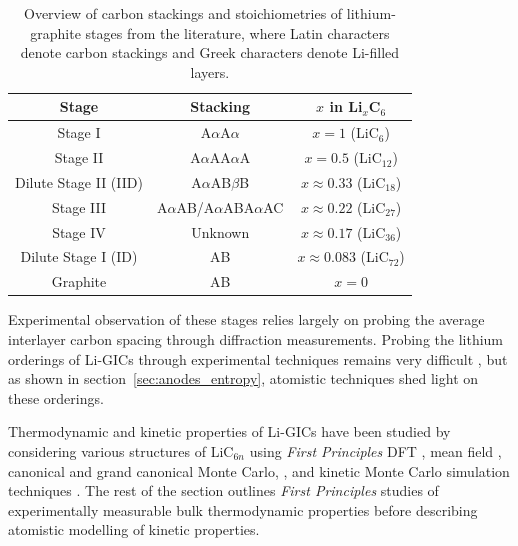 \documentclass[../main.tex]{subfiles}
\begin{document}
\begin{table}
    \caption{{Overview of carbon stackings and stoichiometries of lithium-graphite stages from the literature, where Latin characters denote carbon stackings and Greek characters denote Li-filled layers. \cite{TRUCANO1975,Okamoto1989,GUERARD1975337,Billaud1996,BILLAUD2002299,Woo1983,Dahn1991,Ohzuku1993}}}
    \label{table:graphite_stages}
    \begin{tabular}{|c c c|} 
         \hline
         Stage & Stacking & $x$ in Li$_{x}$C$_{6}$  \\
         \hline
         Stage I & A$\alpha$A$\alpha$ & $x = 1$ (LiC$_{6}$)    \\
         Stage II & A$\alpha$AA$\alpha$A & $x = 0.5$ (LiC$_{12}$)  \\
         Dilute Stage II (IID) & A$\alpha$AB$\beta$B & $x \approx 0.33$ (LiC$_{18}$)   \\
         Stage III & A$\alpha$AB/A$\alpha$ABA$\alpha$AC & $x \approx 0.22$ (LiC$_{27}$) \\
         Stage IV & Unknown & $x \approx 0.17$ (LiC$_{36}$)  \\
         Dilute Stage I (ID) & AB & $x \approx 0.083$ (LiC$_{72}$)  \\
         Graphite & AB & $x = 0$   \\
         \hline
    \end{tabular}
\end{table}

Experimental observation of these stages relies largely on probing the average interlayer carbon spacing through diffraction measurements. Probing the lithium orderings of Li-GICs through experimental techniques remains very difficult \cite{Zheng1995,Konar2015,Senyshyn2013,Taminato2016,Mercer2019,Mercer2021}, but as shown in section~\ref{sec:anodes_entropy}, atomistic techniques shed light on these orderings.

Thermodynamic and kinetic properties of Li-GICs have been studied by considering various structures of LiC$_{6n}$ using \textit{First Principles} DFT \cite{thinius2014theoretical, Hakim, Qiong, Doreen,JI201866,Wang,persson2010,persson2010lithium,hazrati_li_2014,peng2020lithium,hazrati_li_2014}, mean field \cite{Mercer2019,Leiva2017b,OTERO2017569}, canonical and grand canonical Monte Carlo, \cite{Gavil_n_Arriazu_2018,persson2010,C7CP04253A}, and kinetic Monte Carlo simulation techniques \cite{JI201866,persson2010,gavilan-arriazu_effect_2020,gavilan-arriazu_kinetic_2020,GAVILANARRIAZU2018133}. The rest of the section outlines \textit{First Principles} studies of experimentally measurable bulk thermodynamic properties before describing atomistic modelling of kinetic properties.
\end{document}
